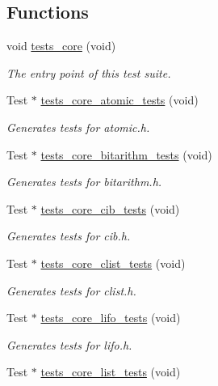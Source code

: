 \subsection*{Functions}
\begin{DoxyCompactItemize}
\item 
void \hyperlink{group__unittests_gaaaf35c94f5a45e12f3556bf2be09b022}{tests\+\_\+core} (void)
\begin{DoxyCompactList}\small\item\em The entry point of this test suite. \end{DoxyCompactList}\item 
Test $\ast$ \hyperlink{group__unittests_gadc7f89b561245603549db45a06d93cce}{tests\+\_\+core\+\_\+atomic\+\_\+tests} (void)
\begin{DoxyCompactList}\small\item\em Generates tests for atomic.\+h. \end{DoxyCompactList}\item 
Test $\ast$ \hyperlink{group__unittests_ga0e92d30389bd2bf5e8482efa37e34733}{tests\+\_\+core\+\_\+bitarithm\+\_\+tests} (void)
\begin{DoxyCompactList}\small\item\em Generates tests for bitarithm.\+h. \end{DoxyCompactList}\item 
Test $\ast$ \hyperlink{group__unittests_gaf6c587a2b7c4b7284754cb254d828ae4}{tests\+\_\+core\+\_\+cib\+\_\+tests} (void)
\begin{DoxyCompactList}\small\item\em Generates tests for cib.\+h. \end{DoxyCompactList}\item 
Test $\ast$ \hyperlink{group__unittests_gac88d9e2710f9a1471a063c472ba78310}{tests\+\_\+core\+\_\+clist\+\_\+tests} (void)
\begin{DoxyCompactList}\small\item\em Generates tests for clist.\+h. \end{DoxyCompactList}\item 
Test $\ast$ \hyperlink{group__unittests_ga00403c34e425101181fbebfe68dc0e33}{tests\+\_\+core\+\_\+lifo\+\_\+tests} (void)
\begin{DoxyCompactList}\small\item\em Generates tests for lifo.\+h. \end{DoxyCompactList}\item 
Test $\ast$ \hyperlink{group__unittests_gac59771a00b4ae805ba06afd6e93578cb}{tests\+\_\+core\+\_\+list\+\_\+tests} (void)

\end{DoxyCompactItemize}
